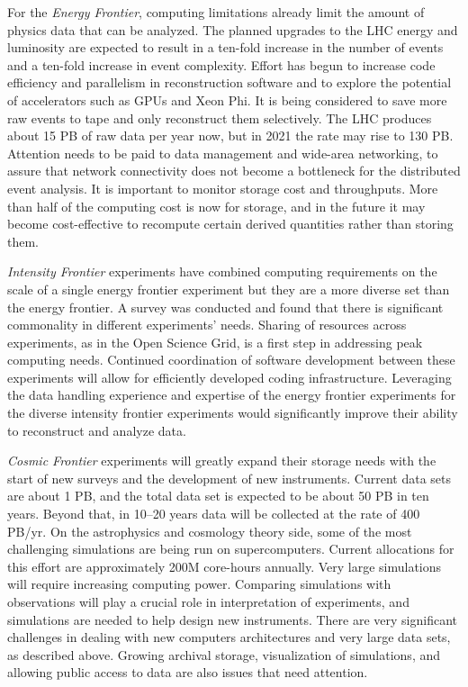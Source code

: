 For the {\it Energy Frontier}, computing limitations already
limit the amount of physics data that can be analyzed. The
planned upgrades to the LHC energy and luminosity are expected to result in
a ten-fold increase in the number of events and a ten-fold increase in
event complexity. Effort has begun to increase code efficiency and
parallelism in reconstruction software and to explore the potential of
accelerators such as GPUs and Xeon Phi. It is being considered to save more 
raw events to tape and only
reconstruct them selectively. The LHC produces about 15 PB of raw data per
year now, but in 2021 the rate may rise to 130 PB. Attention needs to be
paid to data management and wide-area networking, to assure that network
connectivity does not become a bottleneck for the distributed event
analysis. It is important to monitor storage cost and throughputs. More
than half of the computing cost is now for storage, and in the future it
may become cost-effective to recompute certain derived quantities rather
than storing them.

{\it Intensity Frontier} experiments have combined computing requirements
on the scale of a single energy frontier experiment but they are a more
diverse set than the energy frontier. A survey was conducted and found that
there is significant commonality in different experiments' needs. Sharing of
resources across experiments, as in the Open Science Grid, is a first step
in addressing peak computing needs.  Continued coordination of
software development between these experiments will allow for efficiently
developed coding infrastructure.  Leveraging the data handling experience and
expertise of the energy frontier experiments for the diverse intensity
frontier experiments would significantly improve their ability to reconstruct
and analyze data.

{\it Cosmic Frontier} experiments will greatly expand their storage needs
with the start of new surveys and the development of new instruments.
Current data sets are about 1 PB, and the total data set is expected to be
about 50 PB in ten years. Beyond that, in 10--20 years data will be
collected at the rate of 400 PB/yr. On the astrophysics and cosmology
theory side, some of the most challenging simulations are being run on
supercomputers. 
Current allocations for this effort are approximately 200M core-hours annually.
Very large simulations will require increasing computing
power. Comparing simulations with observations will play a crucial role in
interpretation of experiments, and simulations are needed to help design
new instruments. There are very significant challenges in dealing with new
computers architectures and very large data sets, as described above.
Growing archival storage, visualization of simulations, and allowing public
access to data are also issues that need attention.

